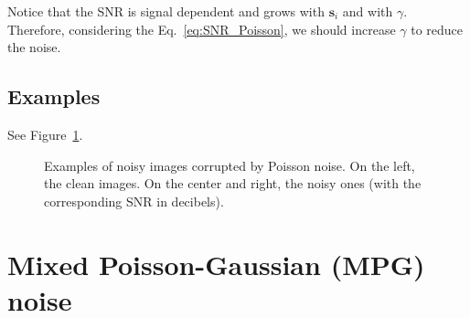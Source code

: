 Notice that the SNR is signal dependent and grows with $\mathbf{s}_i$ and with
$\gamma$. Therefore, considering the Eq.~\ref{eq:SNR_Poisson}, we should increase
$\gamma$ to reduce the noise.

\subsection*{Examples}

See Figure~\ref{fig:Poisson_examples}.

\begin{figure}
  \centering
  \caption{Examples of noisy images corrupted by Poisson noise. On the
    left, the clean images. On the center and right, the noisy ones (with the
    corresponding \gls{SNR} in
    decibels). \label{fig:Poisson_examples}}
\end{figure}


\section{Mixed Poisson-Gaussian (MPG) noise}
\label{sec:MPG}

